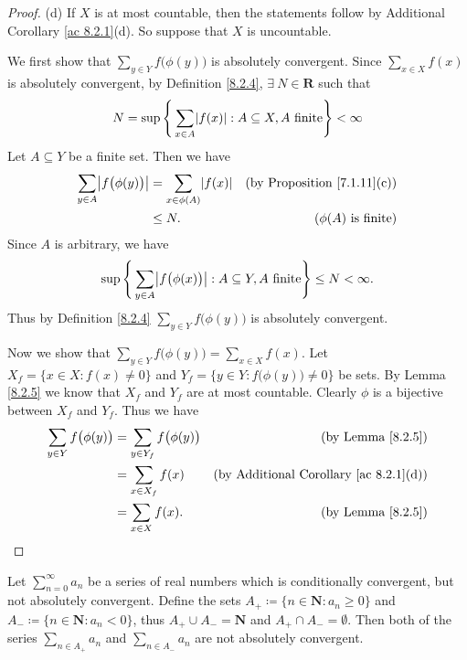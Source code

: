 \begin{proof}{(d)}
    If \(X\) is at most countable, then the statements follow by Additional Corollary \ref{ac 8.2.1}(d).
    So suppose that \(X\) is uncountable.

    We first show that \(\sum_{y \in Y} f\big(\phi(y)\big)\) is absolutely convergent.
    Since \(\sum_{x \in X} f(x)\) is absolutely convergent, by Definition \ref{8.2.4}, \(\exists\ N \in \mathbf{R}\) such that
    \[
        N = \sup\Bigg\{\sum_{x \in A} \abs*{f(x)} : A \subseteq X, A \text{ finite}\Bigg\} < \infty
    \]
    Let \(A \subseteq Y\) be a finite set.
    Then we have
    \begin{align*}
        \sum_{y \in A} \abs*{f\big(\phi(y)\big)} & = \sum_{x \in \phi(A)} \abs*{f(x)} & \text{(by Proposition \ref{7.1.11}(c))} \\
                                                 & \leq N.                            & \text{(\(\phi(A)\) is finite)}
    \end{align*}
    Since \(A\) is arbitrary, we have
    \[
        \sup\Bigg\{\sum_{y \in A} \abs*{f\big(\phi(x)\big)} : A \subseteq Y, A \text{ finite}\Bigg\} \leq N < \infty.
    \]
    Thus by Definition \ref{8.2.4} \(\sum_{y \in Y} f\big(\phi(y)\big)\) is absolutely convergent.

    Now we show that \(\sum_{y \in Y} f\big(\phi(y)\big) = \sum_{x \in X} f(x)\).
    Let \(X_f = \{x \in X : f(x) \neq 0\}\) and \(Y_f = \{y \in Y : f\big(\phi(y)\big) \neq 0\}\) be sets.
    By Lemma \ref{8.2.5} we know that \(X_f\) and \(Y_f\) are at most countable.
    Clearly \(\phi\) is a bijective between \(X_f\) and \(Y_f\).
    Thus we have
    \begin{align*}
        \sum_{y \in Y} f\big(\phi(y)\big) & = \sum_{y \in Y_f} f\big(\phi(y)\big) & \text{(by Lemma \ref{8.2.5})}                      \\
                                          & = \sum_{x \in X_f} f(x)               & \text{(by Additional Corollary \ref{ac 8.2.1}(d))} \\
                                          & = \sum_{x \in X} f(x).                & \text{(by Lemma \ref{8.2.5})}
    \end{align*}
\end{proof}

\begin{lemma}\label{8.2.7}
    Let \(\sum_{n = 0}^\infty a_n\) be a series of real numbers which is conditionally convergent, but not absolutely convergent.
    Define the sets \(A_+ \coloneqq \{n \in \mathbf{N} : a_n \geq 0\}\) and \(A_- \coloneqq \{n \in \mathbf{N} : a_n < 0\}\), thus \(A_+ \cup A_- = \mathbf{N}\) and \(A_+ \cap A_- = \emptyset\).
    Then both of the series \(\sum_{n \in A_+} a_n\) and \(\sum_{n \in A_-} a_n\) are not absolutely convergent.
\end{lemma}

